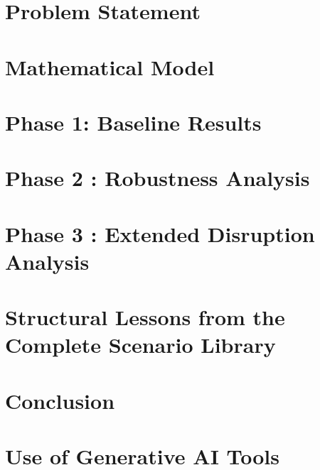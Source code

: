 \documentclass[10pt, twocolumn, a4paper]{article}
\begin{document}

\newpage




\twocolumn
\section{Problem Statement}


\section{Mathematical Model}


\section{Phase 1: Baseline Results}
\label{sec:phase1}


\section{Phase 2 : Robustness Analysis}
\label{sec:phase2}


\section{Phase 3 : Extended Disruption Analysis}
\label{sec:phase3}


\section{Structural Lessons from the Complete Scenario Library}
\label{sec:structural_lessons}


\section{Conclusion}
\label{sec:conclusion}





\section*{Use of Generative AI Tools}


\end{document}
